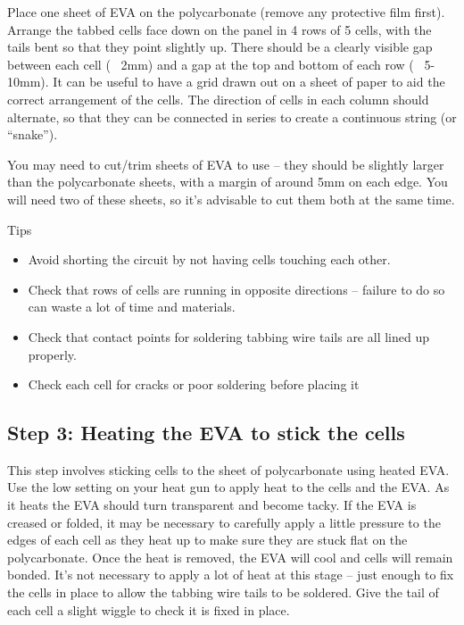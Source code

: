 \documentclass{article}
\theoremstyle{definition}
\theoremstyle{definition}
\theoremstyle{remark}
\begin{document}
    Place one sheet of EVA on the polycarbonate (remove any protective film first). Arrange the tabbed cells face down on the panel in 4 rows of 5 cells, with the tails bent so that they point slightly up. There should be a clearly visible gap between each cell (~ 2mm) and a gap at the top and bottom of each row (~ 5-10mm). It can be useful to have a grid drawn out on a sheet of paper to aid the correct arrangement of the cells. The direction of cells in each column should alternate, so that they can be connected in series to create a continuous string (or “snake”). 

    You may need to cut/trim sheets of EVA to use – they should be slightly larger than the polycarbonate sheets, with a margin of around 5mm on each edge. You will need two of these sheets, so it’s advisable to cut them both at the same time.

    Tips

    \begin{itemize}
      \item Avoid shorting the circuit by not having cells touching each other.
      \item Check that rows of cells are running in opposite directions – failure to do so can waste a lot of time and materials.
      \item Check that contact points for soldering tabbing wire tails are all lined up properly.
      \item Check each cell for cracks or poor soldering before placing it
    \end{itemize}
  

  \subsection{Step 3: Heating the EVA to stick the cells} %
  \label{sub:step_3_heating_the_eva_to_stick_the_cells}

    This step involves sticking cells to the sheet of polycarbonate using heated EVA. Use the low setting on your heat gun to apply heat to the cells and the EVA. As it heats the EVA should turn transparent and become tacky. If the EVA is creased or folded, it may be necessary to carefully apply a little pressure to the edges of each cell as they heat up to make sure they are stuck flat on the polycarbonate. Once the heat is removed, the EVA will cool and cells will remain bonded. It's not necessary to apply a lot of heat at this stage – just enough to fix the cells in place to allow the tabbing wire tails to be soldered. Give the tail of each cell a slight wiggle to check it is fixed in place.
\end{document}
